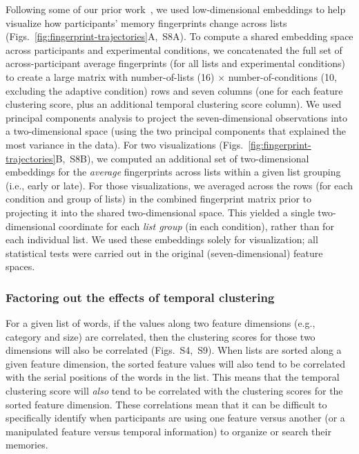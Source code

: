 \documentclass[11pt]{article}
\newcommand{\clusterCorrs}{S4}
\newcommand{\fingerprintTrajectoryRandom}{S8}
\newcommand{\featureCorrs}{S9}
\begin{document}
Following some of our prior work~\citep{FitzEtal23, HeusEtal18a, HeusEtal21,
MannEtal22}, we used low-dimensional embeddings to help visualize how
participants' memory fingerprints change across lists
(Figs.~\ref{fig:fingerprint-trajectories}A,~\fingerprintTrajectoryRandom A). To
compute a shared embedding space across participants and experimental
conditions, we concatenated the full set of across-participant average
fingerprints (for all lists and experimental conditions) to create a large
matrix with number-of-lists (16) $\times$ number-of-conditions (10, excluding
the adaptive condition) rows and seven columns (one for each feature clustering
score, plus an additional temporal clustering score column). We used principal
components analysis to project the seven-dimensional observations into a
two-dimensional space (using the two principal components that explained the
most variance in the data). For two visualizations
(Figs.~\ref{fig:fingerprint-trajectories}B,~\fingerprintTrajectoryRandom B), we
computed an additional set of two-dimensional embeddings for the
\textit{average} fingerprints across lists within a given list grouping (i.e.,
early or late). For those visualizations, we averaged across the rows (for each
condition and group of lists) in the combined fingerprint matrix prior to
projecting it into the shared two-dimensional space. This yielded a single
two-dimensional coordinate for each \textit{list group} (in each condition),
rather than for each individual list. We used these embeddings solely for
visualization; all statistical tests were carried out in the original
(seven-dimensional) feature spaces.

\subsubsection*{Factoring out the effects of temporal clustering}

For a given list of words, if the values along two feature dimensions (e.g.,
category and size) are correlated, then the clustering scores for those two
dimensions will also be correlated (Figs.~\clusterCorrs,~\featureCorrs). When
lists are sorted along a given feature dimension, the sorted feature values
will also tend to be correlated with the serial positions of the words in the
list. This means that the temporal clustering score will \textit{also} tend to
be correlated with the clustering scores for the sorted feature dimension.
These correlations mean that it can be difficult to specifically identify when
participants are using one feature versus another (or a manipulated feature
versus temporal information) to organize or search their memories.
\end{document}
